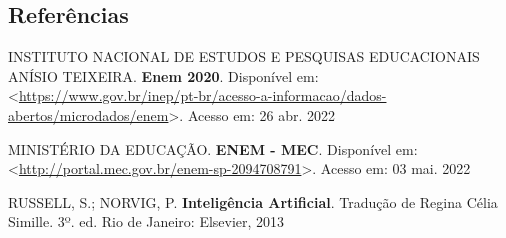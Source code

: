 \documentclass[letterpaper]{article} %
\begin{document}



\subsection{Referências} 

\smallskip \noindent INSTITUTO NACIONAL DE ESTUDOS E PESQUISAS EDUCACIONAIS ANÍSIO TEIXEIRA. \textbf{Enem 2020}.
Disponível em: <\url{https://www.gov.br/inep/pt-br/acesso-a-informacao/dados-abertos/microdados/enem}>. Acesso em: 26 abr. 2022

\smallskip \noindent MINISTÉRIO DA EDUCAÇÃO. \textbf{ENEM - MEC}. Disponível em: <\url{http://portal.mec.gov.br/enem-sp-2094708791}>. Acesso em: 03 mai. 2022

\smallskip \noindent RUSSELL, S.; NORVIG, P. \textbf{Inteligência Artificial}. Tradução de Regina Célia Simille. 3º. ed. Rio de Janeiro: Elsevier, 2013
\end{document}
